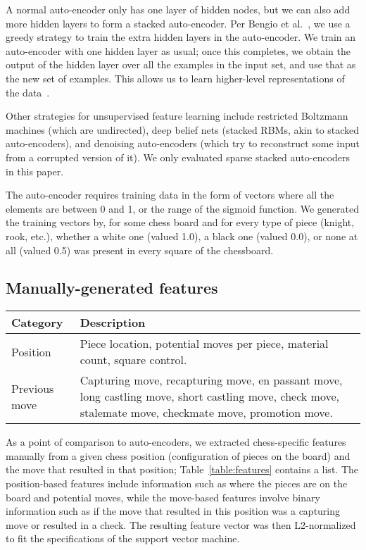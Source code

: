 \documentclass[11pt]{article}
\begin{document}
A normal auto-encoder only has one layer of hidden nodes, but we can also add more hidden layers to form a stacked auto-encoder. Per Bengio et al.~, we use a greedy strategy to train the extra hidden layers in the auto-encoder. We train an auto-encoder with one hidden layer as usual; once this completes, we obtain the output of the hidden layer over all the examples in the input set, and use that as the new set of examples. This allows us to learn higher-level representations of the data~\cite{Vincent}.

Other strategies for unsupervised feature learning include restricted Boltzmann machines (which are undirected), deep belief nets (stacked RBMs, akin to stacked auto-encoders), and denoising auto-encoders (which try to reconstruct some input from a corrupted version of it). We only evaluated sparse stacked auto-encoders in this paper.

The auto-encoder requires training data in the form of vectors where all the elements are between 0 and 1, or the range of the sigmoid function. We generated the training vectors by, for some chess board and for every type of piece (knight, rook, etc.), whether a white one (valued 1.0), a black one (valued 0.0), or none at all (valued 0.5) was present in every square of the chessboard.

\subsection{Manually-generated features}
\begin{table*}
\centering
\begin{tabular}{lp{}}
\hline
\textbf{Category} & \textbf{Description} \\ \hline
Position & Piece location, potential moves per piece, material count, square control. \\
Previous move & Capturing move, recapturing move, en passant move, long castling move, short castling move, check move, stalemate move, checkmate move, promotion move. \\
\hline
\end{tabular} 
\caption{List of chess-specific manual features per position.}
\label{table:features}
\end{table*}

As a point of comparison to auto-encoders, we extracted chess-specific features manually from a given chess position (configuration of pieces on the board) and the move that resulted in that position; Table~\ref{table:features} contains a list. The position-based features include information such as where the pieces are on the board and potential moves, while the move-based features involve binary information such as if the move that resulted in this position was a capturing move or resulted in a check.  The resulting feature vector was then L2-normalized to fit the specifications of the support vector machine.
\end{document}
